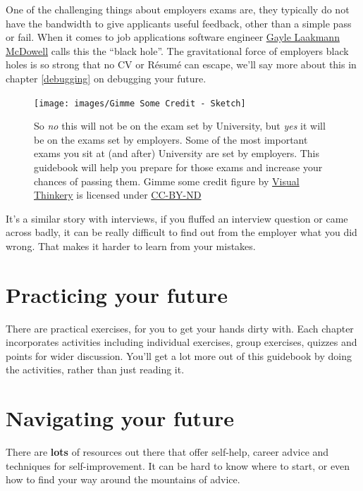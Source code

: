 \documentclass[
]{book}
\begin{document}
One of the challenging things about employers exams are, they typically do not have the bandwidth to give applicants useful feedback, other than a simple pass or fail. When it comes to job applications software engineer \href{https://en.wikipedia.org/wiki/Gayle_Laakmann_McDowell}{Gayle Laakmann McDowell} calls this the ``black hole''. The gravitational force of employers black holes is so strong that no CV or Résumé can escape, we'll say more about this in chapter \ref{debugging} on debugging your future.

\begin{figure}

{\centering \texttt{[image: images/Gimme Some Credit - Sketch]} 

}

\caption{So \emph{no} this will not be on the exam set by University, but \emph{yes} it will be on the exams set by employers. Some of the most important exams you sit at (and after) University are set by employers. This guidebook will help you prepare for those exams and increase your chances of passing them. Gimme some credit figure by \href{https://visualthinkery.com/}{Visual Thinkery} is licensed under \href{https://creativecommons.org/licenses/by-nd/4.0/}{CC-BY-ND}}\label{fig:exam-fig}
\end{figure}



It's a similar story with interviews, if you fluffed an interview question or came across badly, it can be really difficult to find out from the employer what you did wrong. That makes it harder to learn from your mistakes.

\hypertarget{activities}{%
\section{Practicing your future}\label{activities}}

There are practical exercises, for you to get your hands dirty with. Each chapter incorporates activities including individual exercises, group exercises, quizzes and points for wider discussion. You'll get a lot more out of this guidebook by doing the activities, rather than just reading it.

\hypertarget{relatedwork}{%
\section{Navigating your future}\label{relatedwork}}

There are \textbf{lots} of resources out there that offer self-help, career advice and techniques for self-improvement. It can be hard to know where to start, or even how to find your way around the mountains of advice.
\end{document}
